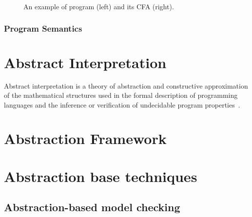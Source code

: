 \begin{figure}
\begin{minipage}[t]{0.48\textwidth}
\begin{tikzpicture}[node distance=1.1em]
\end{tikzpicture}
\end{minipage}

\caption{An example of \llvm program (left) and its CFA (right).}
\label{fig:cfa}
\end{figure}

\subsubsection{Program Semantics}






\section{Abstract Interpretation}

Abstract interpretation \cite{Cousot1977, Cousot1979} is a theory of
abstraction and constructive approximation of the mathematical structures used
in the formal description of programming languages and the inference or
verification of undecidable program properties~\cite{Cousot2012}.


\section{Abstraction Framework}




\section{Abstraction base techniques}

\subsection{Abstraction-based model checking}

